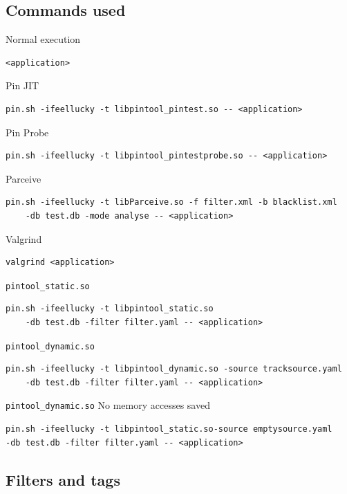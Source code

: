 \subsection{Commands used}

Normal execution
\begin{lstlisting}[style=BashInputStyle]
<application>
\end{lstlisting}

Pin JIT
\begin{lstlisting}[style=BashInputStyle]
pin.sh -ifeellucky -t libpintool_pintest.so -- <application>
\end{lstlisting}

Pin Probe
\begin{lstlisting}[style=BashInputStyle]
pin.sh -ifeellucky -t libpintool_pintestprobe.so -- <application>
\end{lstlisting}

Parceive
\begin{lstlisting}[style=BashInputStyle]
pin.sh -ifeellucky -t libParceive.so -f filter.xml -b blacklist.xml
	-db test.db -mode analyse -- <application>
\end{lstlisting}

Valgrind
\begin{lstlisting}[style=BashInputStyle]
valgrind <application>
\end{lstlisting}

\texttt{pintool\_static.so}
\begin{lstlisting}[style=BashInputStyle]
pin.sh -ifeellucky -t libpintool_static.so
	-db test.db -filter filter.yaml -- <application>
\end{lstlisting}

\texttt{pintool\_dynamic.so}
\begin{lstlisting}[style=BashInputStyle]
pin.sh -ifeellucky -t libpintool_dynamic.so -source tracksource.yaml
	-db test.db -filter filter.yaml -- <application>
\end{lstlisting}

\texttt{pintool\_dynamic.so} No memory accesses saved
\begin{lstlisting}[style=BashInputStyle]
pin.sh -ifeellucky -t libpintool_static.so-source emptysource.yaml
-db test.db -filter filter.yaml -- <application>
\end{lstlisting}

\subsection{Filters and tags}

